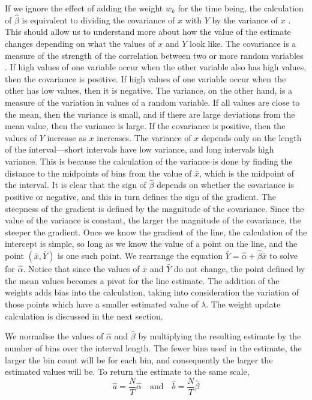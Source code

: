 \documentclass[a4paper,11pt]{article}
\begin{document}
    If we ignore the effect of adding the weight $w_k$ for the time being, the
    calculation of $\hat{\beta}$ is equivalent to dividing the covariance of $x$
    with $Y$ by the variance of $x$ \cite{kenney1962mathematics}. This should allow
    us to understand more about how the value of the estimate changes depending on
    what the values of $x$ and $Y$ look like. The covariance is a measure of the
    strength of the correlation between two or more random variables
    \cite{covariance}. If high values of one variable occur when the other variable
    also has high values, then the covariance is positive. If high values of one
    variable occur when the other has low values, then it is negative. The variance,
    on the other hand, is a measure of the variation in values of a random
    variable. If all values are close to the mean, then the variance is small, and
    if there are large deviations from the mean value, then the variance is
    large. If the covariance is positive, then the values of $Y$ increase as $x$
    increases. The variance of $x$ depends only on the length of the
    interval---short intervals have low variance, and long intervals high
    variance. This is because the calculation of the variance is done by finding the
    distance to the midpoints of bins from the value of $\bar{x}$, which is the
    midpoint of the interval. It is clear that the sign of $\hat{\beta}$ depends on
    whether the covariance is positive or negative, and this in turn defines the
    sign of the gradient. The steepness of the gradient is defined by the magnitude
    of the covariance. Since the value of the variance is constant, the larger the
    magnitude of the covariance, the steeper the gradient. Once we know the gradient
    of the line, the calculation of the intercept is simple, so long as we know the
    value of a point on the line, and the point $(\bar{x},\bar{Y})$ is one such
    point. We rearrange the equation $\bar{Y}=\hat{\alpha}+\hat{\beta}\bar{x}$ to
    solve for $\hat{\alpha}$. Notice that since the values of $\bar{x}$ and
    $\bar{Y}$ do not change, the point defined by the mean values becomes a pivot
    for the line estimate. The addition of the weights adds bias into the calculation,
    taking into consideration the variation of those points which have a smaller
    estimated value of $\lambda$. The weight update calculation is discussed in the
    next section.

    We normalise the values of $\hat{\alpha}$ and $\hat{\beta}$ by multiplying the
    resulting estimate by the number of bins over the interval length. The fewer
    bins used in the estimate, the larger the bin count will be for each bin, and
    consequently the larger the estimated values will be. To return the estimate to
    the same scale, 
    \begin{equation}
    \hat{a}=\frac{N}{T}\hat{\alpha}\quad\text{and}\quad
    \hat{b}=\frac{N}{T}\hat{\beta}
    \end{equation}
\end{document}
